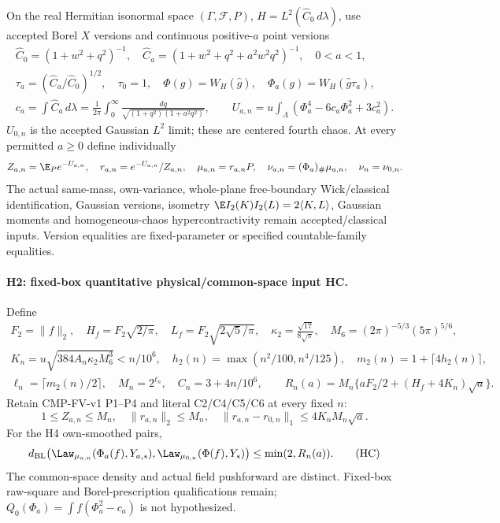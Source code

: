On the real Hermitian isonormal space $(\Gamma,\mathcal F,P)$,
$H=L^2(\hat C_0\,d\lambda)$, use accepted Borel $X$ versions and continuous
positive-$a$ point versions
\begin{gather*}
 \hat C_0=(1+w^2+q^2)^{-1},\quad
 \hat C_a=(1+w^2+q^2+a^2w^2q^2)^{-1},\quad0<a<1,\\
 \tau_a=(\hat C_a/\hat C_0)^{1/2},\quad\tau_0=1,\quad
 \Phi(g)=W_H(\hat g),\quad\Phi_a(g)=W_H(\hat g\tau_a),\\
 c_a=\int\hat C_a\,d\lambda
 =\frac1{2\pi}\int_0^\infty\frac{dq}{\sqrt{(1+q^2)(1+a^2q^2)}},
 \qquad U_{a,n}=u\int_\Lambda(\Phi_a^4-6c_a\Phi_a^2+3c_a^2).
\end{gather*}
$U_{0,n}$ is the accepted Gaussian $L^2$ limit; these are centered fourth
chaos. At every permitted $a\ge0$ define individually
\[
 Z_{a,n}=\E_Pe^{-U_{a,n}},\quad r_{a,n}=e^{-U_{a,n}}/Z_{a,n},\quad
 \mu_{a,n}=r_{a,n}P,\quad\nu_{a,n}=(\Phi_a)_\#\mu_{a,n},\quad\nu_n=\nu_{0,n}.
\]
The actual same-mass, own-variance, whole-plane free-boundary Wick/classical
identification, Gaussian versions, isometry
$\E I_2(K)I_2(L)=2\langle K,L\rangle$, Gaussian moments and homogeneous-chaos
hypercontractivity remain accepted/classical inputs. Version equalities
are fixed-parameter or specified countable-family equalities.

\paragraph{H2: fixed-box quantitative physical/common-space input HC.}
Define
\begin{gather*}
 F_2=\|f\|_2,\quad H_f=F_2\sqrt{2/\pi},\quad L_f=F_2\sqrt{2\sqrt5/\pi},
 \quad\kappa_2=\frac{\sqrt{17}}{8\sqrt\pi},\quad
 M_6=(2\pi)^{-5/3}(5\pi)^{5/6},\\
 K_n=u\sqrt{384A_n\kappa_2M_6^3}<n/10^6,\quad
 h_2(n)=\max(n^2/100,n^4/125),\quad m_2(n)=1+\lceil4h_2(n)\rceil,\\
 \ell_n=\lceil m_2(n)/2\rceil,\quad M_n=2^{\ell_n},\quad C_n=3+4n/10^6,
 \qquad R_n(a)=M_n\{aF_2/2+(H_f+4K_n)\sqrt a\}.
\end{gather*}
Retain CMP-FV-v1 P1--P4 and literal C2/C4/C5/C6 at every fixed $n$:
\[
 1\le Z_{a,n}\le M_n,\quad\|r_{a,n}\|_2\le M_n,\quad
 \|r_{a,n}-r_{0,n}\|_1\le4K_nM_n\sqrt a.
\]
For the H4 own-smoothed pairs,
\begin{equation}
 \cmBL\bigl(\Law_{\mu_{a,n}}(\Phi_a(f),Y_{a,s}),
             \Law_{\mu_{0,n}}(\Phi(f),Y_s)\bigr)
 \le\min(2,R_n(a)).\tag{HC}\label{cm:HC}
\end{equation}
The common-space density and actual field pushforward are distinct.
Fixed-box raw-square and Borel-prescription qualifications remain;
$Q_0(\Phi_a)=\int f(\Phi_a^2-c_a)$ is not hypothesized.

